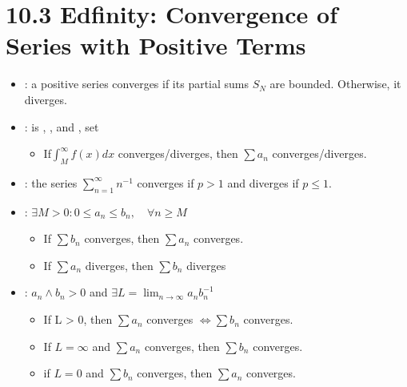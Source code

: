 \section{10.3 Edfinity: Convergence of Series with Positive Terms}
\begin{itemize}
  \item {}:  a positive series
      converges if its partial sums \(S_N\) are bounded. Otherwise, it diverges.
  \item {}:  is , , and
    , set 
    \begin{itemize}
      \item If\(\int_{M}^{\infty} f (x) dx \) converges/diverges, then \(\sum
        a_n\) converges/diverges.
    \end{itemize}

  \item {}: the series \(\sum_{n=1}^{\infty} n^{-1}\)
    converges if \(p>1\) and diverges if \(p \leq 1\).

  \item {}: \(\exists M > 0 : 0 \leq a_n \leq b_n, \quad\forall n \geq M\)
    \begin{itemize}
      \item If \(\sum b_n\) converges, then \(\sum a_n\) converges.
      \item  If \(\sum a_n\) diverges, then \(\sum b_n\) diverges
    \end{itemize}

  \item {}: \({a_n} \land {b_n} > 0\) and \(\exists L = \lim_{n \to \infty} a_n b_n^{-1}\)
    \begin{itemize}
      \item If L > 0, then \(\sum a_n\) converges \(\iff \sum b_n\) converges.
      \item If \(L=\infty\) and \(\sum a_n\) converges, then \(\sum b_n\) converges.
      \item if \(L = 0\) and \(\sum b_n\) converges, then \(\sum a_n\) converges.
    \end{itemize}


\end{itemize}
